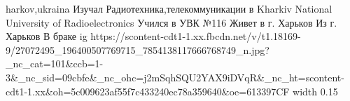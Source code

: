  
 
 
 
 

harkov,ukraina
Изучал Радиотехника,телекоммуникации в Kharkiv National University of Radioelectronics
Учился в УВК №116
Живет в г. Харьков
Из г. Харьков
В браке
\ifcmt
  ig https://scontent-cdt1-1.xx.fbcdn.net/v/t1.18169-9/27072495_196400507769715_7854138117666768749_n.jpg?_nc_cat=101&ccb=1-3&_nc_sid=09cbfe&_nc_ohc=j2mSqhSQU2YAX9iDVqR&_nc_ht=scontent-cdt1-1.xx&oh=5c009623af55f7c433240ec78a359640&oe=613397CF
  width 0.15
\fi

